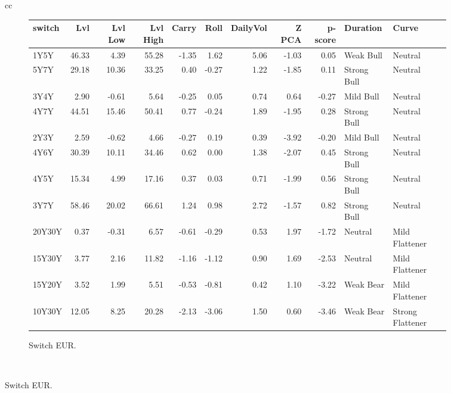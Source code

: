 \documentclass[a4paper,twoside]{report}
\begin{document}
\begin{figure}[htbp]
\begin{tabular}[c]{cc}
\begin{subfigure}[c]{0.5\textwidth}
\caption{Switch EUR.}
\label{fig:Switch EUR}
\begin{adjustbox}{max width=\textwidth}
\begin{tabular}{lrrrrrrrrll}
\hline
 switch &    Lvl &  Lvl Low &  Lvl High &  Carry &  Roll &  DailyVol &  Z PCA &  p-score &     Duration &             Curve \\
\hline
   1Y5Y &  46.33 &     4.39 &     55.28 &  -1.35 &  1.62 &      5.06 &  -1.03 &     0.05 &    Weak Bull &           Neutral \\
   5Y7Y &  29.18 &    10.36 &     33.25 &   0.40 & -0.27 &      1.22 &  -1.85 &     0.11 &  Strong Bull &           Neutral \\
   3Y4Y &   2.90 &    -0.61 &      5.64 &  -0.25 &  0.05 &      0.74 &   0.64 &    -0.27 &    Mild Bull &           Neutral \\
   4Y7Y &  44.51 &    15.46 &     50.41 &   0.77 & -0.24 &      1.89 &  -1.95 &     0.28 &  Strong Bull &           Neutral \\
   2Y3Y &   2.59 &    -0.62 &      4.66 &  -0.27 &  0.19 &      0.39 &  -3.92 &    -0.20 &    Mild Bull &           Neutral \\
   4Y6Y &  30.39 &    10.11 &     34.46 &   0.62 &  0.00 &      1.38 &  -2.07 &     0.45 &  Strong Bull &           Neutral \\
   4Y5Y &  15.34 &     4.99 &     17.16 &   0.37 &  0.03 &      0.71 &  -1.99 &     0.56 &  Strong Bull &           Neutral \\
   3Y7Y &  58.46 &    20.02 &     66.61 &   1.24 &  0.98 &      2.72 &  -1.57 &     0.82 &  Strong Bull &           Neutral \\
 20Y30Y &   0.37 &    -0.31 &      6.57 &  -0.61 & -0.29 &      0.53 &   1.97 &    -1.72 &      Neutral &    Mild Flattener \\
 15Y30Y &   3.77 &     2.16 &     11.82 &  -1.16 & -1.12 &      0.90 &   1.69 &    -2.53 &      Neutral &    Mild Flattener \\
 15Y20Y &   3.52 &     1.99 &      5.51 &  -0.53 & -0.81 &      0.42 &   1.10 &    -3.22 &    Weak Bear &    Mild Flattener \\
 10Y30Y &  12.05 &     8.25 &     20.28 &  -2.13 & -3.06 &      1.50 &   0.60 &    -3.46 &    Weak Bear &  Strong Flattener \\
\hline
\end{tabular}
\end{adjustbox}
 \end{subfigure}\\
 

\end{tabular}
\end{figure}
\end{document}
